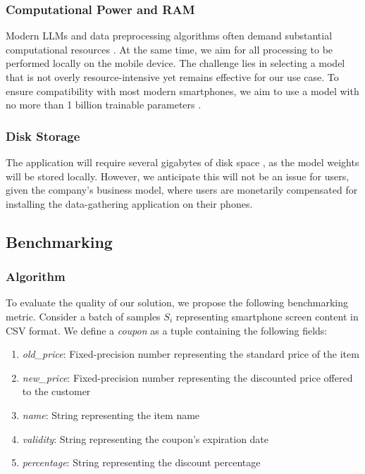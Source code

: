 \documentclass[12pt]{article}
\begin{document}
\subsubsection*{Computational Power and RAM}
Modern LLMs and data preprocessing algorithms often demand substantial computational resources \cite{LLMmobile2024}. At the same time, we aim for all processing to be performed locally on the mobile device. The challenge lies in selecting a model that is not overly resource-intensive yet remains effective for our use case. To ensure compatibility with most modern smartphones, we aim to use a model with no more than 1 billion trainable parameters \cite{li2025palmbenchcomprehensivebenchmarkcompressed}.

\subsubsection*{Disk Storage}
The application will require several gigabytes of disk space \cite{llama32-1b-size}, as the model weights will be stored locally. However, we anticipate this will not be an issue for users, given the company's business model, where users are monetarily compensated for installing the data-gathering application on their phones.


\subsection*{Benchmarking}

\subsubsection*{Algorithm}
To evaluate the quality of our solution, we propose the following benchmarking metric. Consider a batch of samples \( S_i \) representing smartphone screen content in CSV format. We define a \textit{coupon} as a tuple containing the following fields:

\begin{enumerate}
    \item \textit{old\_price}: Fixed-precision number representing the standard price of the item
    \item \textit{new\_price}: Fixed-precision number representing the discounted price offered to the customer
    \item \textit{name}: String representing the item name
    \item \textit{validity}: String representing the coupon's expiration date
    \item \textit{percentage}: String representing the discount percentage
\end{enumerate}
\end{document}
